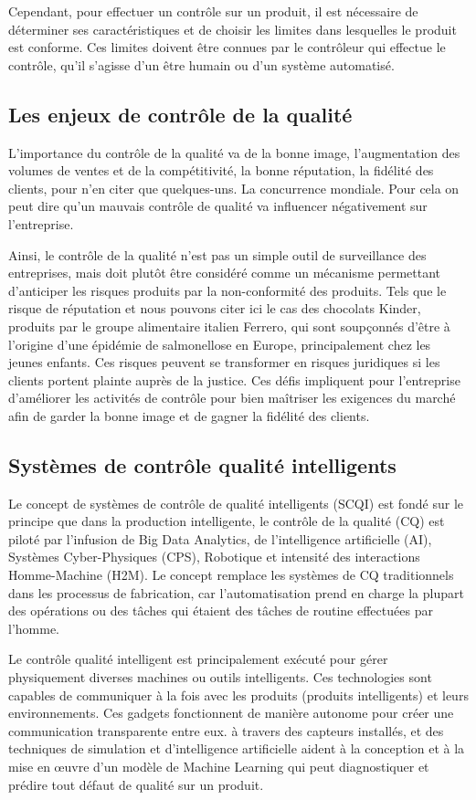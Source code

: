 Cependant, pour effectuer un contrôle sur un produit, il est nécessaire de déterminer ses caractéristiques et de choisir les limites dans lesquelles le produit est conforme. Ces limites doivent être connues par le contrôleur qui effectue le contrôle, qu'il s'agisse d'un être humain ou d'un système automatisé.

\subsection{Les enjeux de contrôle de la qualité}
L'importance du contrôle de la qualité va de la bonne image, l'augmentation des volumes de ventes et de la compétitivité, la bonne réputation, la fidélité des clients, pour n'en citer que quelques-uns. La concurrence mondiale. Pour cela on peut dire qu’un mauvais contrôle de qualité va influencer négativement sur l’entreprise.

Ainsi, le contrôle de la qualité n'est pas un simple outil de surveillance des entreprises, mais doit plutôt être considéré comme un mécanisme permettant d'anticiper les risques produits par la non-conformité des produits. Tels que le risque de réputation et nous pouvons citer ici le cas des chocolats Kinder, produits par le groupe alimentaire italien Ferrero, qui sont soupçonnés d'être à l'origine d'une épidémie de salmonellose en Europe, principalement chez les jeunes enfants. Ces risques peuvent se transformer en risques juridiques si les clients portent plainte auprès de la justice. Ces défis impliquent pour l'entreprise d'améliorer les activités de contrôle pour bien maîtriser les exigences du marché afin de garder la bonne image et de gagner la fidélité des clients.

\subsection{Systèmes de contrôle qualité intelligents}
Le concept de systèmes de contrôle de qualité intelligents (SCQI) est fondé sur le principe que dans la production intelligente, le contrôle de la qualité (CQ) est piloté par l'infusion de Big Data Analytics, de l'intelligence artificielle (AI), Systèmes Cyber-Physiques (CPS), Robotique et intensité des interactions Homme-Machine (H2M). Le concept remplace les systèmes de CQ traditionnels dans les processus de fabrication, car l'automatisation prend en charge la plupart des opérations ou des tâches qui étaient des tâches de routine effectuées par l'homme.

Le contrôle qualité intelligent est principalement exécuté pour gérer physiquement diverses machines ou outils intelligents. Ces technologies sont capables de communiquer à la fois avec les produits (produits intelligents) et leurs environnements. Ces gadgets fonctionnent de manière autonome pour créer une communication transparente entre eux. à travers des capteurs installés, et des techniques de simulation et d'intelligence artificielle aident à la conception et à la mise en œuvre d'un modèle de Machine Learning qui peut diagnostiquer et prédire tout défaut de qualité sur un produit. 

